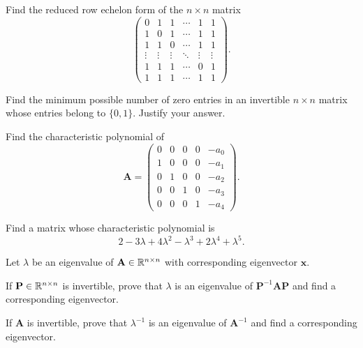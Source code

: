 \documentclass[11pt,oneside]{article}
\begin{document}
\begin{problem}
\begin{problemsubparts}
\item Find the reduced row echelon form of the $n\times n$ matrix
\[
\begin{pmatrix}
0&1&1&\cdots&1&1\\
1&0&1&\cdots&1&1\\
1&1&0&\cdots&1&1\\
\vdots&\vdots&\vdots&\ddots&\vdots&\vdots\\
1&1&1&\cdots&0&1\\
1&1&1&\cdots&1&1
\end{pmatrix}.
\]
\item Find the minimum possible number of zero entries in an invertible $n\times n$ matrix whose entries belong to $\{0,1\}$. Justify your answer.
\end{problemsubparts}
\end{problem}

\begin{problem}
\begin{problemsubparts}
\item Find the characteristic polynomial of
\[
\mathbf A=
\begin{pmatrix}
0&0&0&0&-a_0\\
1&0&0&0&-a_1\\
0&1&0&0&-a_2\\
0&0&1&0&-a_3\\
0&0&0&1&-a_4
\end{pmatrix}.
\]
\item Find a matrix whose characteristic polynomial is
\[
2-3\lambda+4\lambda^2-\lambda^3+2\lambda^4+\lambda^5.
\]
\end{problemsubparts}
\end{problem}

\begin{problem}
Let $\lambda$ be an eigenvalue of $\mathbf A\in\mathbb{R}^{n\times n}$ with corresponding eigenvector $\mathbf x$.
\begin{problemsubparts}
\item If $\mathbf P\in\mathbb{R}^{n\times n}$ is invertible, prove that $\lambda$ is an eigenvalue of $\mathbf P^{-1}\mathbf A\mathbf P$ and find a corresponding eigenvector.
\item If $\mathbf A$ is invertible, prove that $\lambda^{-1}$ is an eigenvalue of $\mathbf A^{-1}$ and find a corresponding eigenvector.
\end{problemsubparts}
\end{problem}
\end{document}
